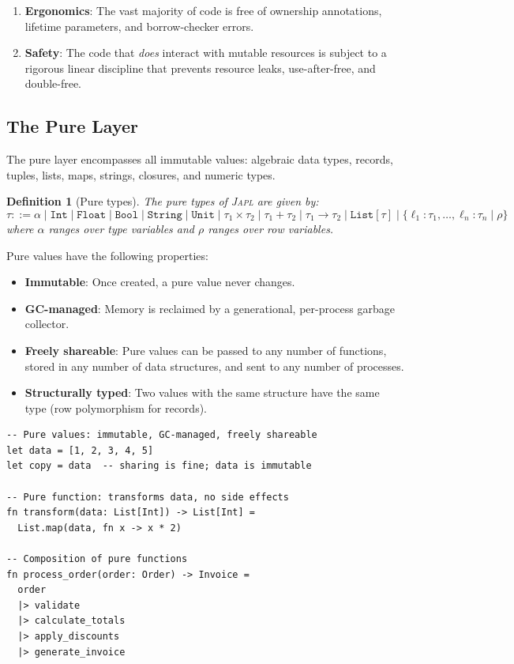 \documentclass[11pt]{article}
\newtheorem{definition}[theorem]{Definition}
\newcommand{\JAPL}{\textsc{Japl}}
\begin{document}
\begin{enumerate}
  \item \textbf{Ergonomics}: The vast majority of code is free of
        ownership annotations, lifetime parameters, and borrow-checker
        errors.
  \item \textbf{Safety}: The code that \emph{does} interact with
        mutable resources is subject to a rigorous linear discipline
        that prevents resource leaks, use-after-free, and
        double-free.
\end{enumerate}

\subsection{The Pure Layer}\label{sec:pure-layer}

The pure layer encompasses all immutable values: algebraic data types,
records, tuples, lists, maps, strings, closures, and numeric types.

\begin{definition}[Pure types]\label{def:pure-types}
The pure types of \JAPL{} are given by:
\[
  \tau ::= \alpha \mid \texttt{Int} \mid \texttt{Float} \mid \texttt{Bool}
         \mid \texttt{String} \mid \texttt{Unit}
         \mid \tau_1 \times \tau_2 \mid \tau_1 + \tau_2
         \mid \tau_1 \to \tau_2 \mid \texttt{List}[\tau]
         \mid \{ \ell_1 : \tau_1, \ldots, \ell_n : \tau_n \mid \rho \}
\]
where $\alpha$ ranges over type variables and $\rho$ ranges over row
variables.
\end{definition}

Pure values have the following properties:

\begin{itemize}
  \item \textbf{Immutable}: Once created, a pure value never changes.
  \item \textbf{GC-managed}: Memory is reclaimed by a generational,
        per-process garbage collector.
  \item \textbf{Freely shareable}: Pure values can be passed to any
        number of functions, stored in any number of data structures,
        and sent to any number of processes.
  \item \textbf{Structurally typed}: Two values with the same structure
        have the same type (row polymorphism for records).
\end{itemize}

\begin{lstlisting}[caption={Pure-layer code: no ownership concerns},label={lst:pure-layer}]
-- Pure values: immutable, GC-managed, freely shareable
let data = [1, 2, 3, 4, 5]
let copy = data  -- sharing is fine; data is immutable

-- Pure function: transforms data, no side effects
fn transform(data: List[Int]) -> List[Int] =
  List.map(data, fn x -> x * 2)

-- Composition of pure functions
fn process_order(order: Order) -> Invoice =
  order
  |> validate
  |> calculate_totals
  |> apply_discounts
  |> generate_invoice
\end{lstlisting}
\end{document}

